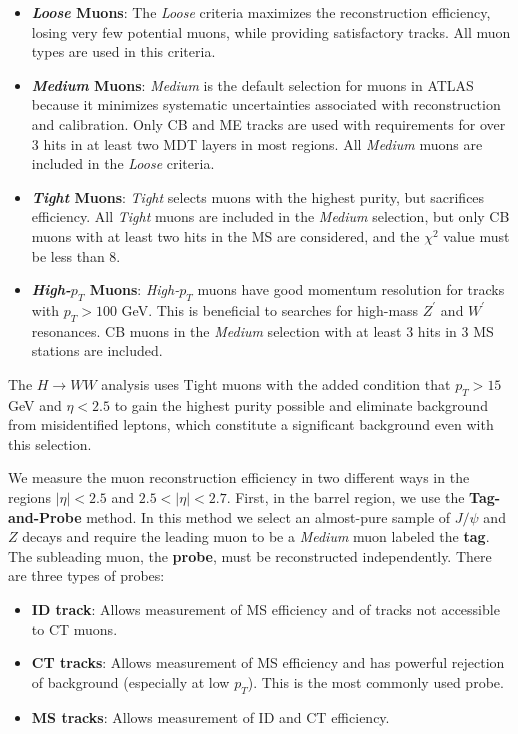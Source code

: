 \begin{itemize}
\item \textbf{\textit{Loose} Muons}: The \textit{Loose} criteria maximizes the reconstruction efficiency, losing very few potential muons, while providing satisfactory tracks. All muon types are used in this criteria.
\item \textbf{\textit{Medium} Muons}: \textit{Medium} is the default selection for muons in ATLAS because it minimizes systematic uncertainties associated with reconstruction and calibration. Only CB and ME tracks are used with requirements for over 3 hits in at least two MDT layers in most regions. All \textit{Medium} muons are included in the \textit{Loose} criteria.
\item \textbf{\textit{Tight} Muons}: \textit{Tight} selects muons with the highest purity, but sacrifices efficiency. All \textit{Tight} muons are included in the \textit{Medium} selection, but only CB muons with at least two hits in the MS are considered, and the $\chi^2$ value must be less than $8$.  
\item \textbf{\textit{High-$p_T$} Muons}: \textit{High-$p_T$} muons have good momentum resolution for tracks with $p_T > 100$ GeV. This is beneficial to searches for high-mass $Z^\prime$ and $W^\prime$ resonances. CB muons in the \textit{Medium} selection with at least $3$ hits in $3$ MS stations are included. 
\end{itemize}

The $H\rightarrow WW$ analysis uses Tight muons with the added condition that $p_T>15$ GeV and $\eta<2.5$ to gain the highest purity possible and eliminate background from misidentified leptons, which constitute a significant background even with this selection. 

We measure the muon reconstruction efficiency in two different ways in the regions $|\eta|  < 2.5$ and $2.5 < |\eta|  < 2.7$. First, in the barrel region, we use the \textbf{Tag-and-Probe} method. In this method we select an almost-pure sample of $J/\psi$ and $Z$ decays and require the leading muon to be a \textit{Medium} muon labeled the \textbf{tag}. The subleading muon, the \textbf{probe}, must be reconstructed independently. There are three types of probes:
\begin{itemize}
\item \textbf{ID track}: Allows measurement of MS efficiency and of tracks not accessible to CT muons. 
\item \textbf{CT tracks}: Allows measurement of MS efficiency and has powerful rejection of background (especially at low $p_T$). This is the most commonly used probe. 
\item \textbf{MS tracks}: Allows measurement of ID and CT efficiency.
\end{itemize}

